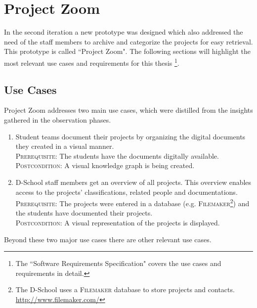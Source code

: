 \section{Project Zoom}
In the second iteration a new prototype was designed which also addressed the need of the staff members to archive and categorize the projects for easy retrieval. This prototype is called ``Project Zoom". The following sections will highlight the most relevant use cases and requirements for this thesis \footnote{The ``Software Requirements Specification"\cite{ReqSpec} covers the use cases and requirements in detail.}.

\subsection{Use Cases}
Project Zoom addresses two main use cases, which were distilled from the insights gathered in the observation phases.

\begin{enumerate}
\item Student teams document their projects by organizing the digital documents they created in a visual manner.\\
\textsc{Prerequisite}: The students have the documents digitally available.\\
\textsc{Postcondition}: A visual knowledge graph is being created. \label{uc:1}

\item D-School staff members get an overview of all projects. This overview enables access to the projects' classifications, related people and documentations.\\
\textsc{Prerequisite}: The projects were entered in a database (e.g. \textsc{Filemaker}\footnote{The D-School uses a \textsc{Filemaker} database to store projects and contacts. \url{http://www.filemaker.com/}}) and the students have documented their projects.\\
\textsc{Postcondition}: A visual representation of the projects is displayed. \label{uc:2}
\end{enumerate}

Beyond these two major use cases there are other relevant use cases.

